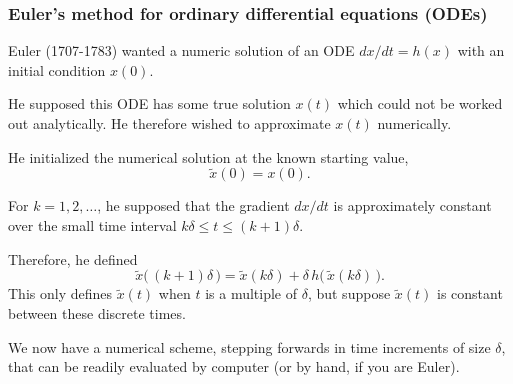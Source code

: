 \documentclass{beamer}\usepackage[]{graphicx}\usepackage[]{color}
\begin{document}
\begin{frame}[fragile]

\frametitle{Euler's method for ordinary differential equations (ODEs)}

\bi

\item Euler (1707-1783) wanted a numeric solution of an ODE $dx/dt = h(x)$
with an initial condition $x(0)$. 

\item He supposed this ODE has some true solution $x(t)$ which could not be worked out analytically. He therefore wished to approximate $x(t)$ numerically.

\item He initialized the numerical solution at the known starting value, 
$$\tilde x(0)=x(0).$$

\item For $k=1,2,\dots$, he supposed that the gradient $dx/dt$ is approximately constant over the small time interval $k\delta\le t\le (k+1)\delta$. 

\item Therefore, he defined
$$\tilde x\big( \,(k+1)\delta\,\big) = \tilde x( k\delta) + \delta \, h\big(\, \tilde x(k\delta)\,\big).$$
This only defines $\tilde x(t)$ when $t$ is a multiple of $\delta$, but suppose $\tilde x(t)$ is constant between these discrete times.

\item We now have a numerical scheme, stepping forwards in time increments of size $\delta$, that can be readily evaluated by computer (or by hand, if you are Euler). 

\ei

\end{frame}
\end{document}
